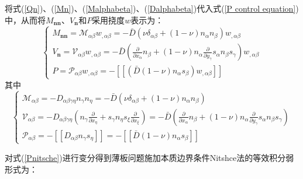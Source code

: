 将式(\ref{Qn})、(\ref{Mn})、(\ref{Malphabeta})、(\ref{Dalphabeta})代入式(\ref{P control equation})中，从而将$M_{\pmb{nn}}$、$V_{\pmb n}$和$P$采用挠度$w$表示为：
\begin{equation}
\begin{cases}\label{MVP}
        M_{\pmb{nn}}=\mathcal{M}_{\alpha\beta}w_{,\alpha\beta}=-\bar{D}(\nu\delta_{\alpha\beta}+(1-\nu)n_{\alpha}n_{\beta})w_{,\alpha\beta}\\
        V_{\pmb{n}}=\mathcal{V}_{\alpha\beta}w_{,\alpha\beta}=-\bar{D}(\frac{\partial}{\partial x_{\alpha}}n_{\beta}+(1-\nu)n_{\alpha}\frac{\partial}{\partial y_{\gamma}}s_{\alpha}n_{\beta}s_{\gamma})w_{,\alpha\beta}\\
        P=\mathcal{P}_{\alpha\beta}w_{,\alpha\beta}=-[[(\bar{D}(1-\nu)n_{\alpha}s_{\beta})w_{,\alpha\beta}]]
\end{cases}
\end{equation}
其中
\begin{equation}
\begin{cases}\label{MVP1}
 \mathcal{M}_{\alpha\beta}=-D_{\alpha\beta\gamma\eta}n_{\gamma}n_{\eta}=-\bar{D}(\nu\delta_{\alpha\beta}+(1-\nu)n_{\alpha}n_{\beta})\\
  \mathcal{V}_{\alpha\beta}=-D_{\alpha\beta\gamma\eta}(n_{\gamma}\frac{\partial}{\partial x_{\eta}}+s_{\gamma}n_{\eta}s_{\xi}\frac{\partial}{\partial x_{\xi}})
  =-\bar{D}(\frac{\partial}{\partial x_{\alpha}}n_{\beta}+(1-\nu)n_{\alpha}\frac{\partial}{\partial y_{\gamma}}s_{\alpha}n_{\beta}s_{\gamma})\\
 \mathcal{P}_{\alpha\beta}=-[[D_{\alpha\beta}n_{\gamma}s_{\eta}]]=-[[\bar{D}(1-\nu)n_{\alpha}s_{\beta}]]
\end{cases}
\end{equation}\par
对式(\ref{Pnitsche})进行变分得到薄板问题施加本质边界条件Nitshce法的等效积分弱形式为：
